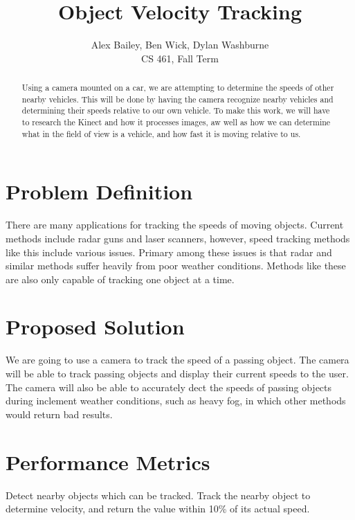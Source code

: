 \documentclass[letterpaper,10pt,onecolumn,draftclsnofoot]{IEEEtran}
\title{Object Velocity Tracking}
\author{Alex Bailey, Ben Wick, Dylan Washburne\\CS 461, Fall Term}
\begin{document}
\begin{titlepage}

\maketitle

\begin{abstract}
Using a camera mounted on a car, we are attempting to determine the speeds of other nearby vehicles.  This will be done by having the camera recognize nearby vehicles and determining their speeds relative to our own vehicle. To make this work, we will have to research the Kinect and how it processes images, aw well as how we can determine what in the field of view is a vehicle, and how fast it is moving relative to us.
\end{abstract}

\end{titlepage}

\section{Problem Definition}

There are many applications for tracking the speeds of moving objects.
Current methods include radar guns and laser scanners, however, speed tracking methods like this include various issues.
Primary among these issues is that radar and similar methods suffer heavily from poor weather conditions.
Methods like these are also only capable of tracking one object at a time.


\section{Proposed Solution}

We are going to use a camera to track the speed of a passing object.
The camera will be able to track passing objects and display their current speeds to the user.
The camera will also be able to accurately dect the speeds of passing objects during inclement weather conditions, such as heavy fog, in which other methods would return bad results.

\section{Performance Metrics}

Detect nearby objects which can be tracked.
Track the nearby object to determine velocity, and return the value within 10\% of its actual speed.



\end{document}
